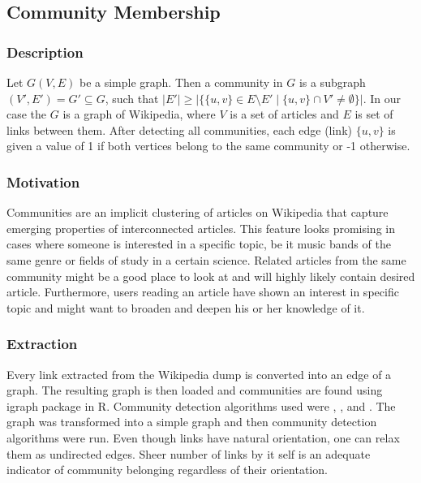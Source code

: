 \subsection{Community Membership}

\subsubsection{Description}
Let $G(V,E)$ be a simple graph. Then a community in $G$ is a subgraph $(V', E') = G' \subseteq G$, such that $|E'| \ge |\{ \{u,v\} \in E\setminus E'  \; | \; \{u, v\} \cap V' \neq \emptyset \}|$. In our case the $G$ is a graph of Wikipedia, where $V$ is a set of articles and $E$ is set of links between them. After detecting all communities, each edge (link) $\{u,v\}$ is given a value of 1 if both vertices belong to the same community or -1 otherwise.

\subsubsection{Motivation}
Communities are an implicit clustering of articles on Wikipedia that capture emerging properties of interconnected articles. This feature looks promising in cases where someone is interested in a specific topic, be it music bands of the same genre or fields of study in a certain science. Related articles from the same community might be a good place to look at and will highly likely contain desired article. Furthermore, users reading an article have shown an interest in specific topic and might want to broaden and deepen his or her knowledge of it.

\subsubsection{Extraction}
Every link extracted from the Wikipedia dump is converted into an edge of a graph. The resulting graph is then loaded and communities are found using igraph package in R. Community detection algorithms used were \cite{fast_greedy}, \cite{label_propagation}, and \cite{infomap}. The graph was transformed into a simple graph and then community detection algorithms were run. Even though links have natural orientation, one can relax them as undirected edges. Sheer number of links by it self is an adequate indicator of community belonging regardless of their orientation.

